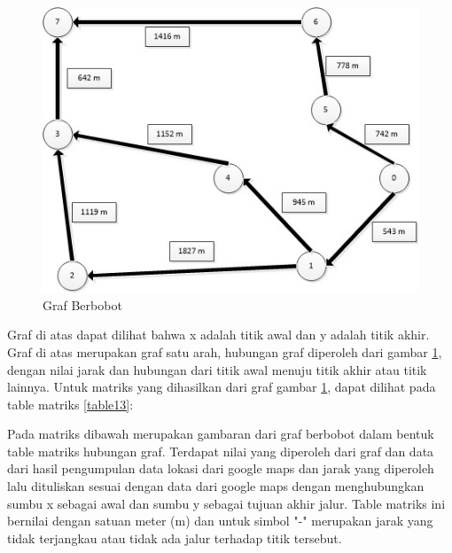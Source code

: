 \begin{figure}[h]
    \centering
    \includegraphics[scale=0.4]{figures/ALGORITMA/GRAF2.png}
    \caption{Graf Berbobot}
    \label{gambar13}
\end{figure}

\par Graf di atas dapat dilihat bahwa x adalah titik awal dan y adalah titik akhir. Graf di atas merupakan graf satu arah, hubungan graf diperoleh dari gambar \ref{gambar13}, dengan nilai jarak dan hubungan dari titik awal menuju titik akhir atau titik lainnya. Untuk matriks yang dihasilkan dari graf gambar \ref{gambar13}, dapat dilihat pada table matriks \ref{table13}:
\par Pada matriks dibawah merupakan gambaran dari graf berbobot dalam bentuk table matriks hubungan graf. Terdapat nilai yang diperoleh dari graf dan data dari hasil pengumpulan data lokasi dari google maps dan jarak yang diperoleh lalu dituliskan sesuai dengan data dari google maps dengan menghubungkan sumbu x sebagai awal dan sumbu y sebagai tujuan akhir jalur. Table matriks ini bernilai dengan satuan meter (m) dan untuk simbol "-" merupakan jarak yang tidak terjangkau atau tidak ada jalur terhadap titik tersebut.

\vspace{1cm}

